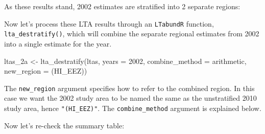 \documentclass[
]{book}
\newenvironment{Shaded}{\begin{snugshade}}{\end{snugshade}}
\newcommand{\AttributeTok}[1]{\textcolor[rgb]{0.77,0.63,0.00}{#1}}
\newcommand{\ConstantTok}[1]{\textcolor[rgb]{0.00,0.00,0.00}{#1}}
\newcommand{\ControlFlowTok}[1]{\textcolor[rgb]{0.13,0.29,0.53}{\textbf{#1}}}
\newcommand{\DecValTok}[1]{\textcolor[rgb]{0.00,0.00,0.81}{#1}}
\newcommand{\FunctionTok}[1]{\textcolor[rgb]{0.00,0.00,0.00}{#1}}
\newcommand{\NormalTok}[1]{#1}
\newcommand{\OtherTok}[1]{\textcolor[rgb]{0.56,0.35,0.01}{#1}}
\newcommand{\SpecialCharTok}[1]{\textcolor[rgb]{0.00,0.00,0.00}{#1}}
\newcommand{\StringTok}[1]{\textcolor[rgb]{0.31,0.60,0.02}{#1}}
\begin{document}
As these results stand, 2002 estimates are stratified into 2 separate regions:

\begin{Shaded}
\end{Shaded}

Now let's process these LTA results through an \texttt{LTabundR} function, \texttt{lta\_destratify()}, which will combine the separate regional estimates from 2002 into a single estimate for the year.

\begin{Shaded}
\begin{Highlighting}[]
\NormalTok{ltas\_2a }\OtherTok{\textless{}{-}}
  \FunctionTok{lta\_destratify}\NormalTok{(ltas,}
               \AttributeTok{years =} \DecValTok{2002}\NormalTok{,}
               \AttributeTok{combine\_method =} \StringTok{\textquotesingle{}arithmetic\textquotesingle{}}\NormalTok{,}
               \AttributeTok{new\_region =} \StringTok{\textquotesingle{}(HI\_EEZ)\textquotesingle{}}\NormalTok{)}
\end{Highlighting}
\end{Shaded}

The \texttt{new\_region} argument specifies how to refer to the combined region. In this case we want the 2002 study area to be named the same as the unstratified 2010 study area, hence \texttt{"(HI\_EEZ)"}. The \texttt{combine\_method} argument is explained below.

Now let's re-check the summary table:

\begin{Shaded}
\end{Shaded}
\end{document}
